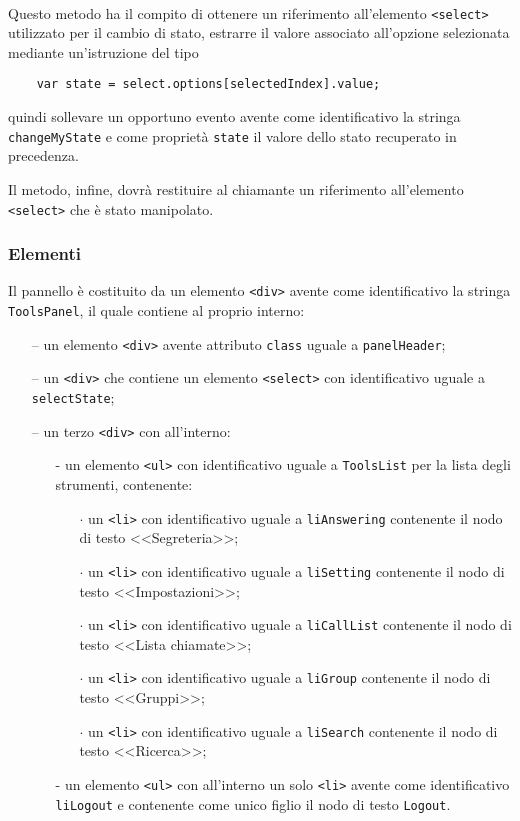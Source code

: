 \begin{description}
  \item{}\\
  Questo metodo ha il compito di ottenere un riferimento all'elemento \verb'<select>' utilizzato per il cambio di stato, estrarre il valore associato all'opzione selezionata mediante un'istruzione del tipo
  \begin{verbatim}
    var state = select.options[selectedIndex].value;
  \end{verbatim}
  quindi sollevare un opportuno evento avente come identificativo la stringa \verb'changeMyState' e come proprietà \verb'state' il valore dello stato recuperato in precedenza.
  
  Il metodo, infine, dovrà restituire al chiamante un riferimento all'elemento \verb'<select>' che è stato manipolato.
\end{description}

\subsubsection*{Elementi}
Il pannello è costituito da un elemento \verb'<div>' avente come identificativo la stringa \verb'ToolsPanel', il quale contiene al proprio interno:
\begin{itemize}
  \item[--] un elemento \verb'<div>' avente attributo \verb'class' uguale a \verb'panelHeader';
  \item[--] un \verb'<div>' che contiene un elemento \verb'<select>' con identificativo uguale a \verb'selectState';
  \item[--] un terzo \verb'<div>' con all'interno:
  \begin{itemize}
    \item[-] un elemento \verb'<ul>' con identificativo uguale a \verb'ToolsList' per la lista degli strumenti, contenente:
      \begin{itemize}
        \item[$\cdot$] un \verb'<li>' con identificativo uguale a \verb'liAnswering' contenente il nodo di testo <<Segreteria>>;
        \item[$\cdot$] un \verb'<li>' con identificativo uguale a \verb'liSetting' contenente il nodo di testo <<Impostazioni>>;
        \item[$\cdot$] un \verb'<li>' con identificativo uguale a \verb'liCallList' contenente il nodo di testo  <<Lista chiamate>>;
        \item[$\cdot$] un \verb'<li>' con identificativo uguale a \verb'liGroup' contenente il nodo di testo <<Gruppi>>;
        \item[$\cdot$] un \verb'<li>' con identificativo uguale a \verb'liSearch' contenente il nodo di testo <<Ricerca>>;
      \end{itemize}
    \item[-] un elemento \verb'<ul>' con all'interno un solo \verb'<li>' avente come identificativo \verb'liLogout' e contenente come unico figlio il nodo di testo \verb'Logout'.
  \end{itemize}
\end{itemize}


